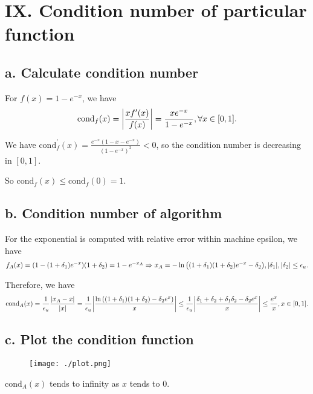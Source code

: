 \documentclass[a4paper]{article}
\begin{document}
\section*{IX. Condition number of particular function}
\subsection*{a. Calculate condition number}
For $f(x) = 1 - e^{-x}$, we have
\begin{equation}
    \text{cond}_f(x) = \abs{\frac{x f^\prime(x)}{f(x)}} = \frac{xe^{-x}}{1-e^{-x}}, \forall x \in [0, 1]. 
\end{equation}

We have $\text{cond}_f^ \prime (x) = \frac{e^{-x}(1-x-e^{-x})}{(1-e^{-x})^2} < 0$, so the condition number is decreasing in $[0, 1]$.

So $\text{cond}_f(x) \leq \text{cond}_f(0) = 1$.

\subsection*{b. Condition number of algorithm}

For the exponential is computed with relative error within machine epsilon, we have
\begin{equation}
    f_A(x) = (1 - (1+\delta_1) e^{-x})(1+\delta_2) = 1 - e^{-x_A} \Rightarrow x_A = -\ln\qty(\qty(1+\delta_1)\qty(1+\delta_2)e^{-x}-\delta_2), \abs{\delta_1}, \abs{\delta_2} \leq \epsilon_u.
\end{equation}

Therefore, we have
\begin{equation}
    \text{cond}_A(x) = \frac{1}{\epsilon_u} \frac{\abs{x_A-x}}{\abs{x}} = \frac{1}{\epsilon_u} \abs{\frac{\ln\qty(\qty(1+\delta_1)\qty(1+\delta_2)-\delta_2 e^x)}{x}} \leq \frac{1}{\epsilon_u} \abs{\frac{\delta_1 + \delta_2 + \delta_1 \delta_2 - \delta_2 e^x}{x}} \leq \frac{e^x}{x}, x\in[0,1].
\end{equation}

\subsection*{c. Plot the condition function}
\begin{figure}[H]
    \centering
    \texttt{[image: ./plot.png]}
\end{figure}

$\text{cond}_A(x)$ tends to infinity as $x$ tends to $0$.
\end{document}
